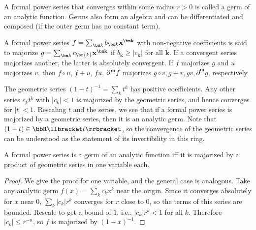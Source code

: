 \begin{defn}
    A formal power series that converges within some radius $r>0$ is called a germ of an analytic function. Germs also form an algebra and can be differentiated and composed (if the outer germ has no constant term).
\end{defn}

\begin{defn}[Majorants]
    A formal power series $f=\sum_{\bm k} b_{\bm k}\bf{x}^{\bm k}$ with non-negative coefficients is said to majorize $g=\sum_{\bm k} c_{\bm{k}}\bf{x}^{\bm k}$ if $b_{\bm k}\geq |c_{\bm k}|$ for all $\bm{k}$. If a convergent series majorizes another, the latter is absolutely convergent. If $f$ majorizes $g$ and $u$ majorizes $v$, then $f\circ u$, $f+u$, $fu$, $\partial^{\bf{m}}f$ majorizes $g\circ v,g+v,gv,\partial^{\bm m}g$, respectively. 
\end{defn}

\begin{example}
    The geometric series $(1-t)^{-1}=\sum_k t^k$ has positive coefficients. Any other series $c_k t^k$ with $|c_k|<1$ is majorized by the geometric series, and hence converges for $|t|<1$.  Rescaling $t$ and the series, we see that if a formal power series is majorized by a geometric series, then it is an analytic germ. Note that $(1-t)\in\bbR\llbracket t\rrbracket$, so the convergence of the geometric series can be understood as the statement of its invertibility in this ring.
\end{example}

\begin{lem}\label{lem 121}
    A formal power series is a germ of an analytic function iff it is majorized by a product of geometric series in one variable each.
\end{lem}
\begin{proof}
    We give the proof for one variable, and the general case is analogous. Take any analytic germ $f(x)=\sum_k c_k x^k$ near the origin. Since it converges absolutely for $x$ near $0$, $\sum_k |c_k| r^k$ converges for $r$ close to $0$, so the terms of this series are bounded. Rescale to get a bound of $1$, i.e., $|c_k|r^k<1$ for all $k$. 
    Therefore $|c_k|\leq r^{-n}$, so $f$ is majorized by $(1-x)^{-1}$.
\end{proof}

